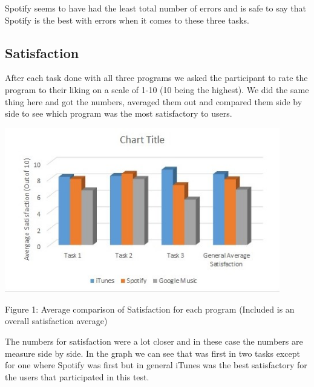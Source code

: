 \documentclass{article}
\begin{document}
Spotify seems to have had the least total number of errors and is safe to say that Spotify is the best with errors when it comes to these three tasks.

\subsection{Satisfaction}
After each task done with all three programs we asked the participant to rate the program to their liking on a scale of 1-10 (10 being the highest). We did the same thing here and got the numbers, averaged them out and compared them side by side to see which program was the most satisfactory to users.

\begin{center}
\includegraphics[width=120mm]{Satisfaction.jpg} %
\end{center}
\begin{center}
Figure 1: Average comparison of Satisfaction for each program (Included is an overall satisfaction average)
\end{center}

The numbers for satisfaction were a lot closer and in these case the numbers are measure side by side. In the graph we can see that was first in two tasks except for one where Spotify was first but in general iTunes was the best satisfactory for the users that participated in this test.
\end{document}
